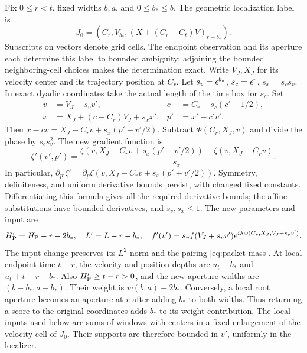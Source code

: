 Fix \(0\le r<t\), fixed widths \(b,a\), and \(0\le b_*\le b\).
The geometric localization label is
\begin{equation}
 J_0=\left(C_r,V_{b_*},
             (X+(C_r-C_t)V)_{r+b_*}\right).
 \label{eq:packet-localizer}
\end{equation}
Subscripts on vectors denote grid cells.  The endpoint observation
and its aperture each determine this label to bounded ambiguity;
adjoining the bounded neighboring-cell choices makes the determination
exact.  Write \(V_J,X_J\) for its velocity center and its trajectory
position at \(C_r\).  Let
\(s_v=\epsilon^{b_*}\), \(s_c=\epsilon^r\), \(s_x=s_cs_v\).  In exact
dyadic coordinates take the actual length of the time box for \(s_c\).
Set
\begin{align}
 v&=V_J+s_vv',&
 c&=C_r+s_c(c'-1/2),\\
 x&=X_J+(c-C_r)V_J+s_xx',&
 p'&=x'-c'v'.
 \label{eq:packet-rescale-coordinates}
\end{align}
Then \(x-cv=X_J-C_rv+s_x(p'+v'/2)\).  Subtract
\(\Phi(C_r,X_J,v)\) and divide the phase by \(s_cs_v^2\).
The new gradient function is
\begin{equation}
 \zeta'(v',p')=
 \frac{\zeta(v,X_J-C_rv+s_x(p'+v'/2))
       -\zeta(v,X_J-C_rv)}{s_x}.
 \label{eq:packet-rescaled-phase}
\end{equation}
In particular,
\(\partial_{p'}\zeta'=\partial_p\zeta(v,X_J-C_rv+s_x(p'+v'/2))\).
Symmetry, definiteness, and uniform derivative bounds persist, with
changed fixed constants.  Differentiating this formula gives all
the required derivative bounds; the affine substitutions have bounded
derivatives, and \(s_v,s_x\le1\).
The new parameters and input are
\begin{equation}
 H_{\mathrm P}'=H_{\mathrm P}-r-2b_*,\quad L'=L-r-b_*,\quad
 f'(v')=s_v f(V_J+s_vv')e^{i\lambda\Phi(C_r,X_J,V_J+s_vv')}.
 \label{eq:packet-rescaled-parameters}
\end{equation}
The input change preserves its \(L^2\) norm and the pairing
\eqref{eq:packet-mass}.  At local endpoint time \(t-r\), the velocity
and position depths are \(u_t-b_*\) and \(u_t+t-r-b_*\).
Also \(H_{\mathrm P}'\ge t-r>0\), and the new aperture widths are
\((b-b_*,a-b_*)\).  Their weight is \(w(b,a)-2b_*\).
Conversely, a local root aperture becomes an aperture at \(r\) after
adding \(b_*\) to both widths.  Thus returning a score to the original
coordinates adds \(b_*\) to its weight contribution.
The local inputs used below are sums of windows with centers in a
fixed enlargement of the velocity cell of \(J_0\).  Their supports
are therefore bounded in \(v'\), uniformly in the localizer.

